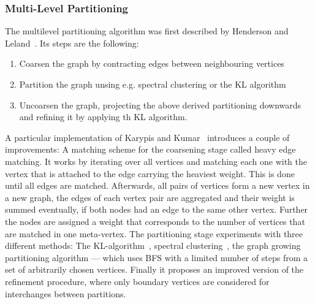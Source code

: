             \subsubsection*{Multi-Level Partitioning}\label{mlp}
                The multilevel partitioning algorithm was first described by Henderson and Leland~\autocite{hendrickson1995multi}. 
                Its steps are the following:
                \begin{enumerate}
                    \item Coarsen the graph by contracting edges between neighbouring vertices
                    \item Partition the graph unsing e.g. spectral clustering or the KL algorithm
                    \item Uncoarsen the graph, projecting the above derived partitioning downwards and refining it by applying th KL algorithm.
                \end{enumerate}
                A particular implementation of Karypis and Kumar~\autocite{karypis} introduces a couple of improvements:
                A matching scheme for the coarsening stage called heavy edge matching.
                It works by iterating over all vertices and matching each one with the vertex that is attached to the edge carrying the heaviest weight.
                This is done until all edges are matched.
                Afterwards, all pairs of vertices form a new vertex in a new graph, the edges of each vertex pair are aggregated and their weight is summed eventually, if both nodes had an edge to the same other vertex. 
                Further the nodes are assigned a weight that corresponds to the number of vertices that are matched in one meta-vertex.
                The partitioning stage experiments with three different methods: The KL-algorithm~\autocite{kl}, spectral clustering~\autocite{spectral}, the graph growing partitioning algorithm --- which uses BFS with a limited number of steps from a set of arbitrarily chosen vertices.
                Finally it proposes an improved version of the refinement procedure, where only boundary vertices are considered for interchanges between partitions.
                
